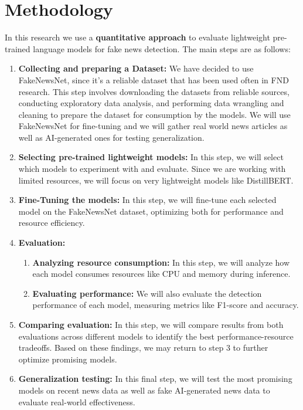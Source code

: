 \documentclass{article}
\begin{document}
\section{Methodology}
In this research we use a \textbf{quantitative approach} to evaluate lightweight pre-trained language models for fake news detection. The main steps are as follows:
\begin{enumerate}
    \item \textbf{Collecting and preparing a Dataset:} We have decided to use FakeNewsNet, since it's a reliable dataset that has been used often in FND research. This step involves downloading the datasets from reliable sources, conducting exploratory data analysis, and performing data wrangling and cleaning to prepare the dataset for consumption by the models. We will use FakeNewsNet for fine-tuning and we will gather real world news articles as well as AI-generated ones for testing generalization.
    \item \textbf{Selecting pre-trained lightweight models:} In this step, we will select which models to experiment with and evaluate. Since we are working with limited resources, we will focus on very lightweight models like DistillBERT.
    \item \textbf{Fine-Tuning the models:} In this step, we will fine-tune each selected model on the FakeNewsNet dataset, optimizing both for performance and resource efficiency.
    \item \textbf{Evaluation:}
    \begin{enumerate}
        \item \textbf{Analyzing resource consumption:} In this step, we will analyze how each model consumes resources like CPU and memory during inference.
        \item \textbf{Evaluating performance:} We will also evaluate the detection performance of each model, measuring metrics like F1-score and accuracy.
    \end{enumerate}
    \item \textbf{Comparing evaluation:} In this step, we will compare results from both evaluations across different models to identify the best performance-resource tradeoffs. Based on these findings, we may return to step 3 to further optimize promising models.
    \item \textbf{Generalization testing:} In this final step, we will test the most promising models on recent news data as well as fake AI-generated news data to evaluate real-world effectiveness.
\end{enumerate}
\end{document}
